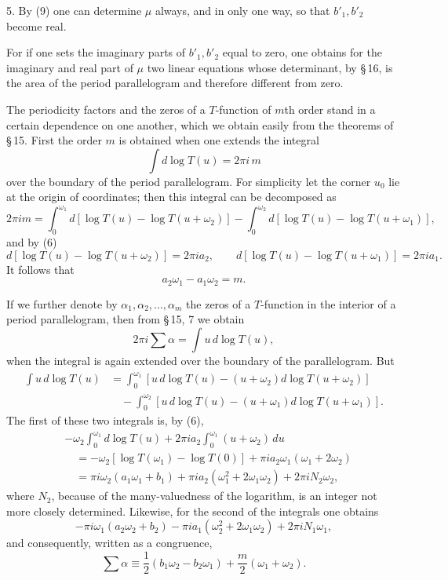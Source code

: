 \documentclass[11pt]{article}
\begin{document}
5. By (9) one can determine $\mu$ always, and in only one way, so that $b'_1,b'_2$ become real.

For if one sets the imaginary parts of $b'_1,b'_2$ equal to zero, one obtains for the imaginary and real part of $\mu$ two linear equations whose determinant, by \S\,16, is the area of the period parallelogram and therefore different from zero.

The periodicity factors and the zeros of a $T$-function of $m$th order stand in a certain dependence on one another, which we obtain easily from the theorems of \S\,15. First the order $m$ is obtained when one extends the integral
\[
\int d\log T(u)=2\pi i\,m
\]
over the boundary of the period parallelogram. For simplicity let the corner $u_0$ lie at the origin of coordinates; then this integral can be decomposed as
\[
2\pi i m=\int_{0}^{\omega_1}d[\log T(u)-\log T(u+\omega_2)]
-\int_{0}^{\omega_2}d[\log T(u)-\log T(u+\omega_1)],
\]
and by (6)
\[
d[\log T(u)-\log T(u+\omega_2)]=2\pi i a_2,\qquad
d[\log T(u)-\log T(u+\omega_1)]=2\pi i a_1.
\]
It follows that
\begin{equation}
a_2\omega_1-a_1\omega_2=m.
\tag{10}
\end{equation}

If we further denote by $\alpha_1,\alpha_2,\ldots,\alpha_m$ the zeros of a $T$-function in the interior of a period parallelogram, then from \S\,15, 7 we obtain
\[
2\pi i\sum\alpha=\int u\,d\log T(u),
\]
when the integral is again extended over the boundary of the parallelogram. But
\begin{align*}
\int u\,d\log T(u)
&=\int_{0}^{\omega_1}\!\!\left[u\,d\log T(u)-(u+\omega_2)d\log T(u+\omega_2)\right]\\
&\quad-\int_{0}^{\omega_2}\!\!\left[u\,d\log T(u)-(u+\omega_1)d\log T(u+\omega_1)\right].
\end{align*}
The first of these two integrals is, by (6),
\begin{align*}
&-\omega_2\int_0^{\omega_1}d\log T(u)+2\pi i a_2\int_0^{\omega_1}(u+\omega_2)\,du\\
&\quad=-\omega_2[\log T(\omega_1)-\log T(0)]+\pi i a_2\omega_1(\omega_1+2\omega_2)\\
&\quad=\pi i\omega_2(a_1\omega_1+b_1)+\pi i a_2(\omega_1^2+2\omega_1\omega_2)+2\pi iN_2\omega_2,
\end{align*}
where $N_2$, because of the many-valuedness of the logarithm, is an integer not more closely determined. Likewise, for the second of the integrals one obtains
\[
-\pi i\omega_1(a_2\omega_2+b_2)-\pi i a_1(\omega_2^2+2\omega_1\omega_2)+2\pi iN_1\omega_1,
\]
and consequently, written as a congruence,
\begin{equation}
\sum\alpha\equiv \frac12(b_1\omega_2-b_2\omega_1)+\frac{m}{2}(\omega_1+\omega_2).
\tag{11}
\end{equation}
\end{document}
